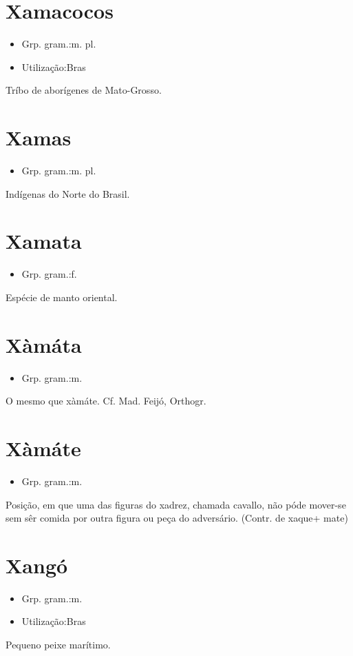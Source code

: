 \section{Xamacocos}
\begin{itemize}
\item {Grp. gram.:m. pl.}
\end{itemize}
\begin{itemize}
\item {Utilização:Bras}
\end{itemize}
Tríbo de aborígenes de Mato-Grosso.
\section{Xamas}
\begin{itemize}
\item {Grp. gram.:m. pl.}
\end{itemize}
Indígenas do Norte do Brasil.
\section{Xamata}
\begin{itemize}
\item {Grp. gram.:f.}
\end{itemize}
Espécie de manto oriental.
\section{Xàmáta}
\begin{itemize}
\item {Grp. gram.:m.}
\end{itemize}
O mesmo que \textunderscore xàmáte\textunderscore . Cf. Mad. Feijó, \textunderscore Orthogr.\textunderscore 
\section{Xàmáte}
\begin{itemize}
\item {Grp. gram.:m.}
\end{itemize}
Posição, em que uma das figuras do xadrez, chamada cavallo, não póde mover-se sem sêr comida por outra figura ou peça do adversário.
(Contr. de \textunderscore xaque\textunderscore  + \textunderscore mate\textunderscore )
\section{Xangó}
\begin{itemize}
\item {Grp. gram.:m.}
\end{itemize}
\begin{itemize}
\item {Utilização:Bras}
\end{itemize}
Pequeno peixe marítimo.
